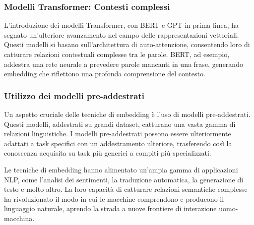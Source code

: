 \subsubsection{Modelli Transformer: Contesti complessi}
L'introduzione dei modelli Transformer, con BERT e GPT in prima linea, ha segnato un'ulteriore avanzamento nel campo delle rappresentazioni vettoriali. Questi modelli si basano sull'architettura di auto-attenzione, consentendo loro di catturare relazioni contestuali complesse tra le parole. BERT, ad esempio, addestra una rete neurale a prevedere parole mancanti in una frase, generando embedding che riflettono una profonda comprensione del contesto.

\subsubsection{Utilizzo dei modelli pre-addestrati}
Un aspetto cruciale delle tecniche di embedding è l'uso di modelli pre-addestrati. Questi modelli, addestrati su grandi dataset, catturano una vasta gamma di relazioni linguistiche. I modelli pre-addestrati possono essere ulteriormente adattati a task specifici con un addestramento ulteriore, trasferendo così la conoscenza acquisita su task più generici a compiti più specializzati.


Le tecniche di embedding hanno alimentato un'ampia gamma di applicazioni NLP, come l'analisi dei sentimenti, la traduzione automatica, la generazione di testo e molto altro. La loro capacità di catturare relazioni semantiche complesse ha rivoluzionato il modo in cui le macchine comprendono e producono il linguaggio naturale, aprendo la strada a nuove frontiere di interazione uomo-macchina.